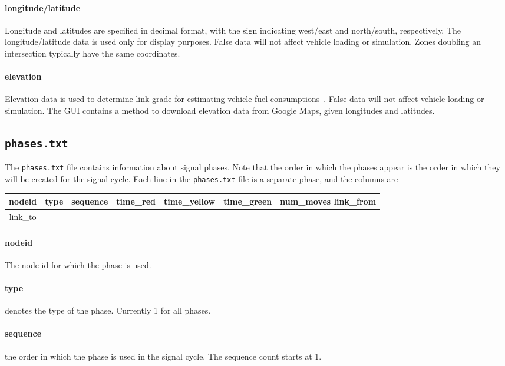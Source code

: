 \paragraph*{longitude/latitude}
Longitude and latitudes are specified in decimal format, with the sign indicating west/east and north/south, respectively. The longitude/latitude data is used only for display purposes. False data will not affect vehicle loading or simulation. Zones doubling an intersection typically have the same coordinates.

\paragraph*{elevation}
Elevation data is used to determine link grade for estimating vehicle fuel consumptions~\cite{levin2014effect}. False data will not affect vehicle loading or simulation. The GUI contains a method to download elevation data from Google Maps, given longitudes and latitudes.

\subsection{\texttt{phases.txt}}
The \texttt{phases.txt} file contains information about signal phases. Note that the order in which the phases appear is the order in which they will be created for the signal cycle. Each line in the \texttt{phases.txt} file is a separate phase, and the columns are
\begin{center}
\begin{tabular}{ccccccc}
\hline
nodeid & type & sequence & time\_red & time\_yellow & time\_green & num\_moves	link\_from \\ \hline \hline
link\_to\\\hline
\end{tabular}
\end{center}
\paragraph*{nodeid} The node id for which the phase is used.
\paragraph*{type} denotes the type of the phase. Currently 1 for all phases.
\paragraph*{sequence} the order in which the phase is used in the signal cycle. The sequence count starts at 1.
